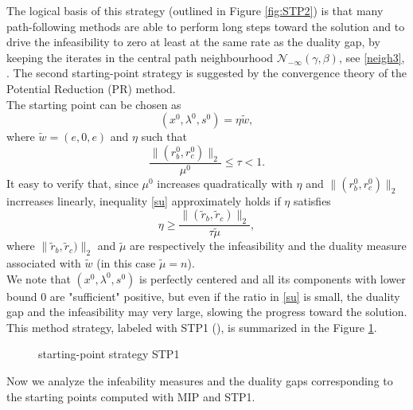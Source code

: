 \documentclass[a4paper,10 pt,titlepage,twoside]{book}
\theoremstyle{plain}
\theoremstyle{definition}
\theoremstyle{remark}
\begin{document}
\begin{figure}[t]
	\begin{center}
			
	\end{center}
\end{figure}
The logical basis of this strategy (outlined in Figure \ref{fig:STP2}) is that many path-following methods are able to perform long steps toward the solution and to drive the infeasibility to zero at least at the same rate as the duality gap, by keeping the iterates in the central path neighbourhood $\mathcal{N}_{-\infty}(\gamma,\beta)$, see \ref{neigh3},  \cite{SPS}.
The second starting-point strategy is suggested by the convergence theory of the Potential Reduction (PR) method.\\
The starting point can be chosen as \begin{equation*}
(x^{0}, \lambda^{0}, s^{0}) = \eta \tilde{w},
\end{equation*}where $\tilde{w} = (e,0,e)$ and $\eta$ such that 
\begin{equation}\label{su}
\frac{\lVert(r^{0}_{b},r^{0}_{c})\rVert_{2}}{\mu^{0}}\leq \tau<1. 
\end{equation}
It easy to verify that, since $\mu^{0}$ increases quadratically with $\eta$ and $\lVert(r^{0}_{b},r^{0}_{c})\rVert_{2}$ incrreases linearly, inequality \ref{su} approximately holds if $\eta$ satisfies
\begin{equation*}
\eta\geq \frac{\lVert(\tilde{r}_{b},\tilde{r}_{c})\rVert_{2}}{\tau\tilde{\mu}},
\end{equation*}
where $\lVert\tilde{r}_{b},\tilde{r}_{c})\rVert_{2}$ and $\tilde{\mu}$ are respectively the infeasibility and the duality measure associated with $\tilde{w}$ (in this case $\tilde{\mu} = n$). \\
We note that $(x^{0},\lambda^{0},s^{0})$ is perfectly centered and all its components with lower bound 0 are "sufficient" positive, but even if the ratio in \ref{su} is small, the duality gap and the infeasibility may very large, slowing the progress toward the solution.\\
This method strategy, labeled with STP1 (\cite{SPS}), is summarized in the Figure \ref{fig:STP1}.\\
\begin{figure}[h]
	\begin{center}
\caption{\label{fig:STP1} starting-point strategy STP1}	
\end{center}
\end{figure}
Now we analyze the infeability measures and the duality gaps corresponding to the starting points computed with MIP and STP1.\\
\end{document}
